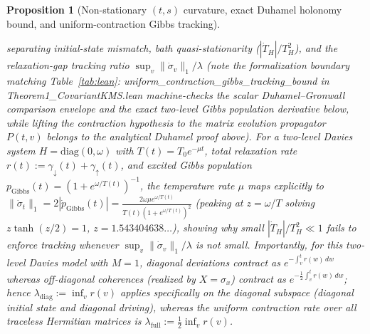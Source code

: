 \documentclass[11pt,a4paper]{article}
\newtheorem{proposition}{Proposition}
\theoremstyle{definition}
\theoremstyle{remark}
\newcommand{\1}{\mathbf{1}}
\newcommand{\code}[1]{{\scriptsize\ttfamily #1}}
\begin{document}
\begin{proposition}[Non-stationary $(t,s)$ curvature, exact Duhamel holonomy bound, and uniform-contraction Gibbs tracking]
\begin{enumerate}
  separating initial-state mismatch, bath quasi-stationarity ($|\dot{T}_H|/T_H^2$), and the relaxation-gap tracking ratio $\sup_v\|\dot{\sigma}_v\|_1/\lambda$ (note the formalization boundary matching Table~\ref{tab:lean}: \code{uniform\_\allowbreak contraction\_\allowbreak gibbs\_\allowbreak tracking\_\allowbreak bound} in \code{Theorem1\_\allowbreak CovariantKMS.lean} machine-checks the scalar Duhamel--Gronwall comparison envelope and the exact two-level Gibbs population derivative below, while lifting the contraction hypothesis to the matrix evolution propagator $P(t,v)$ belongs to the analytical Duhamel proof above). For a two-level Davies system $H=\mathrm{diag}(0,\omega)$ with $T(t)=T_0 e^{-\mu t}$, total relaxation rate $r(t):=\gamma_\downarrow(t)+\gamma_\uparrow(t)$, and excited Gibbs population $p_{\mathrm{Gibbs}}(t)=(1+e^{\omega/T(t)})^{-1}$, the temperature rate $\mu$ maps explicitly to $\|\dot{\sigma}_t\|_1 = 2|\dot{p}_{\mathrm{Gibbs}}(t)| = \frac{2\omega\mu e^{\omega/T(t)}}{T(t)(1+e^{\omega/T(t)})^2}$ (peaking at $z=\omega/T$ solving $z\tanh(z/2)=1$, $z=1.543404638\dots$), showing why small $|\dot{T}_H|/T_H^2\ll 1$ fails to enforce tracking whenever $\sup_v\|\dot{\sigma}_v\|_1 / \lambda$ is not small. Importantly, for this two-level Davies model with $M=1$, diagonal deviations contract as $e^{-\int_v^t r(w)\,dw}$ whereas off-diagonal coherences (realized by $X=\sigma_x$) contract as $e^{-\frac{1}{2}\int_v^t r(w)\,dw}$; hence $\lambda_{\mathrm{diag}} := \inf_v r(v)$ applies specifically on the \emph{diagonal subspace} (diagonal initial state and diagonal driving), whereas the uniform contraction rate over \emph{all} traceless Hermitian matrices is $\lambda_{\mathrm{full}} := \frac{1}{2}\inf_v r(v)$.
\end{enumerate}
\end{proposition}
\end{document}
